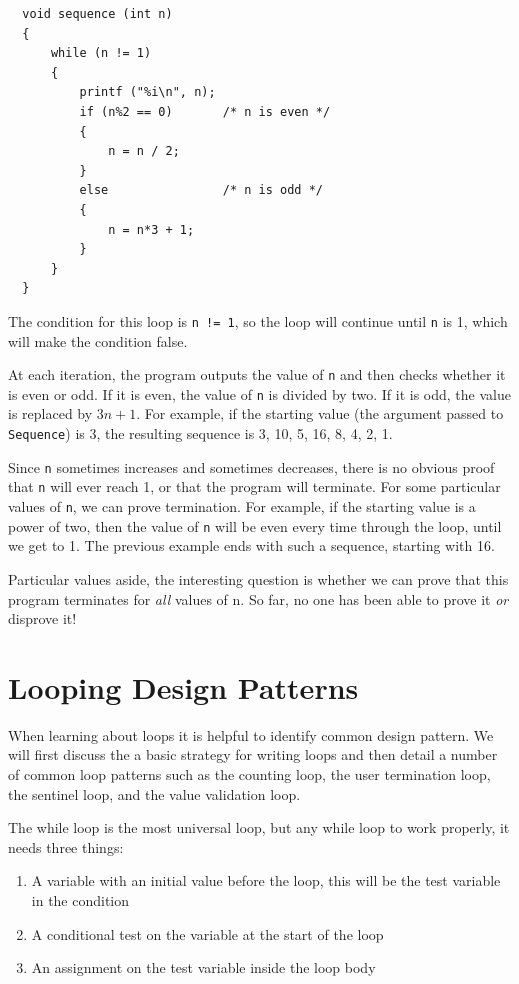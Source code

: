 \begin{verbatim}
  void sequence (int n) 
  {
      while (n != 1) 
      {
          printf ("%i\n", n);
          if (n%2 == 0)       /* n is even */
          {          
              n = n / 2;
          } 
          else                /* n is odd */
          {                  
              n = n*3 + 1;
          }
      }
  }
\end{verbatim}
%
The condition for this loop is {\tt n != 1}, so the loop
will continue until {\tt n} is 1, which will make the condition
false.

At each iteration, the program outputs the value of {\tt n} and then
checks whether it is even or odd.  If it is even, the value of
{\tt n} is divided by two.  If it is odd, the value is replaced
by $3n+1$.  For example, if the starting value (the argument passed
to {\tt Sequence}) is 3, the resulting sequence is
3, 10, 5, 16, 8, 4, 2, 1.

Since {\tt n} sometimes increases and sometimes decreases, there is no
obvious proof that {\tt n} will ever reach 1, or that the program will
terminate.  For some particular values of {\tt n}, we can prove
termination.  For example, if the starting value is a power of two, then
the value of {\tt n} will be even every time through the loop, until
we get to 1.  The previous example ends with such a sequence,
starting with 16.

Particular values aside, the interesting question is whether
we can prove that this program terminates for {\em all} values of n.
So far, no one has been able to prove it {\em or} disprove it!

\section{Looping Design Patterns}
When learning about loops it is helpful to identify common design pattern.
We will first discuss the a basic strategy for writing loops and then detail a number of common loop patterns such as the counting loop, the user termination loop, the sentinel loop, and the value validation loop.

The while loop is the most universal loop, but any while loop to work properly, it needs three things:
\begin{enumerate}
	\item A variable with an initial value before the loop, this will be the test variable in the condition
	\item A conditional test on the variable at the start of the loop
	\item An assignment on the test variable inside the loop body
\end{enumerate}

